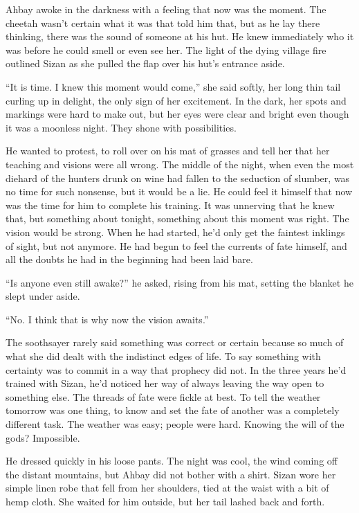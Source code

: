 Ahbay awoke in the darkness with a feeling that now was the moment. The cheetah wasn't certain what it was that told him that, but as he lay there thinking, there was the sound of someone at his hut. He knew immediately who it was before he could smell or even see her. The light of the dying village fire outlined Sizan as she pulled the flap over his hut's entrance aside.

``It is time. I knew this moment would come,'' she said softly, her long thin tail curling up in delight, the only sign of her excitement. In the dark, her spots and markings were hard to make out, but her eyes were clear and bright even though it was a moonless night. They shone with possibilities.

He wanted to protest, to roll over on his mat of grasses and tell her that her teaching and visions were all wrong. The middle of the night, when even the most diehard of the hunters drunk on wine had fallen to the seduction of slumber, was no time for such nonsense, but it would be a lie. He could feel it himself that now was the time for him to complete his training. It was unnerving that he knew that, but something about tonight, something about this moment was right. The vision would be strong. When he had started, he'd only get the faintest inklings of sight, but not anymore. He had begun to feel the currents of fate himself, and all the doubts he had in the beginning had been laid bare.

``Is anyone even still awake?'' he asked, rising from his mat, setting the blanket he slept under aside.

``No. I think that is why now the vision awaits.''

The soothsayer rarely said something was correct or certain because so much of what she did dealt with the indistinct edges of life. To say something with certainty was to commit in a way that prophecy did not. In the three years he'd trained with Sizan, he'd noticed her way of always leaving the way open to something else. The threads of fate were fickle at best. To tell the weather tomorrow was one thing, to know and set the fate of another was a completely different task. The weather was easy; people were hard. Knowing the will of the gods? Impossible.

He dressed quickly in his loose pants. The night was cool, the wind coming off the distant mountains, but Ahbay did not bother with a shirt. Sizan wore her simple linen robe that fell from her shoulders, tied at the waist with a bit of hemp cloth. She waited for him outside, but her tail lashed back and forth.

